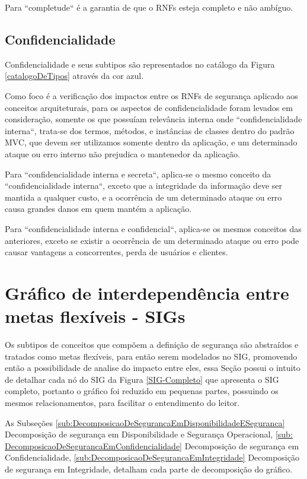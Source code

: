 Para ``completude`` é a garantia de que o RNFs esteja completo e não ambíguo.

\subsection{Confidencialidade}

Confidencialidade e seus subtipos são representados no catálogo da Figura \ref{catalogoDeTipos} através da cor azul. 

Como foco é a verificação dos impactos entre os RNFs de segurança aplicado aos conceitos arquiteturais, para os aspectos de confidencialidade foram levados em consideração, somente os que possuíam relevância interna onde ``confidencialidade interna``, trata-se dos termos, métodos, e instâncias de classes dentro do padrão MVC, que devem ser utilizamos somente dentro da aplicação, e um determinado ataque ou erro interno não prejudica o mantenedor da aplicação.

Para ``confidencialidade interna e secreta``, aplica-se o mesmo conceito da ``confidencialidade interna``, exceto que a integridade da informação deve ser mantida a qualquer custo, e a ocorrência de um determinado ataque ou erro causa grandes danos em quem mantém a aplicação.

Para ``confidencialidade interna e confidencial``, aplica-se os mesmos conceitos das anteriores, exceto se existir a ocorrência de um determinado ataque ou erro pode causar vantagens a concorrentes, perda de usuários e clientes. 

\section{Gráfico de interdependência entre metas flexíveis - SIGs}
\label{sec:SIG}

Os subtipos de conceitos que compõem a definição de segurança são abstraídos e tratados como metas flexíveis, para então serem modelados no SIG, promovendo então a possibilidade de analise do impacto entre eles, essa Seção possui o intuito de detalhar cada nó do SIG da Figura \ref{SIG-Completo} que apresenta o SIG completo, portanto o gráfico foi reduzido em pequenas partes, possuindo os mesmos relacionamentos, para facilitar o entendimento do leitor.

As Subseções \ref{sub:DecomposicaoDeSegurancaEmDisponibilidadeESeguranca} Decomposição de segurança em Disponibilidade e Segurança Operacional, \ref{sub: DecomposicaoDeSegurancaEmConfidencialidade} Decomposição de segurança em Confidencialidade, \ref{sub:DecomposicaoDeSegurancaEmIntegridade} Decomposição de segurança em Integridade, detalham cada parte de decomposição do gráfico. 

